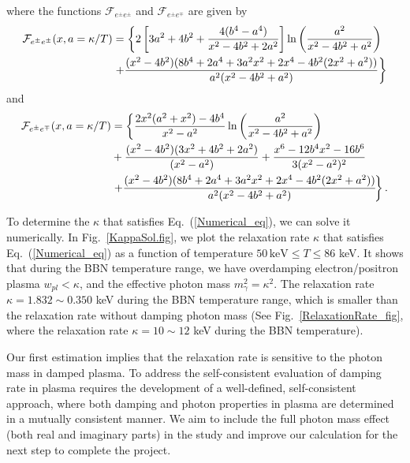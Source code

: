 where the functions $\mathcal{F}_{e^\pm e^\pm}$ and $\mathcal{F}_{e^\pm e^\mp}$ are given by
\begin{align}
\mathcal{F}_{e^\pm e^\pm}(x,a=\kappa/T)&=\left\{2\left[3a^2+4b^2+\frac{4(b^4-a^4)}{x^2-4b^2+2a^2}\right]\ln\left(\frac{a^2}{x^2-4b^2+a^2}\right)\right.\notag\\
&\left.+\frac{(x^2-4b^2)(8b^4+2a^4+3a^2x^2+2x^4-4b^2(2x^2+a^2))}{a^2(x^2-4b^2+a^2)}\right\}
\end{align}
and 
\begin{align}
\mathcal{F}_{e^\pm e^\mp}(x,a=\kappa/T)&=\left\{\frac{2x^2(a^2+x^2)-4b^4}{x^2-a^2}\ln\left(\frac{a^2}{x^2-4b^2+a^2}\right)\right.\notag\\
&+\frac{(x^2-4b^2)(3x^2+4b^2+2a^2)}{(x^2-a^2)}+\frac{x^6-12b^4x^2-16b^6}{3(x^2-a^2)^2}\notag\\
&\left.+\frac{(x^2-4b^2)(8b^4+2a^4+3a^2x^2+2x^4-4b^2(2x^2+a^2))}{a^2(x^2-4b^2+a^2)}\!\right\}.
\end{align}

To determine the $\kappa$ that satisfies Eq.~(\ref{Numerical_eq}), we can solve it numerically. 
In Fig.~\ref{KappaSol.fig}, we plot the relaxation rate $\kappa$ that satisfies Eq.~(\ref{Numerical_eq}) as a function of temperature $50\,\mathrm{keV} \leqslant T\leqslant 86$ keV. It shows that during the BBN temperature range, we have overdamping electron/positron plasma $w_{pl}<\kappa$, and the effective photon mass $m^2_\gamma=\kappa^2$. The relaxation rate $\kappa=1.832\sim0.350$ keV during the BBN temperature range, which is smaller than the relaxation rate without damping photon mass (See Fig.~\ref{RelaxationRate_fig}, where the relaxation rate $\kappa=10\sim12$ keV during the BBN temperature).

Our first estimation implies that the relaxation rate is sensitive to the photon mass in damped plasma. To address the self-consistent evaluation of damping  rate in plasma requires the development of a well-defined, self-consistent approach, where both damping and photon properties in plasma are determined in a mutually consistent manner. We aim to include the full photon mass effect (both real and imaginary parts) in the study and improve our calculation for the next step to complete the project.

